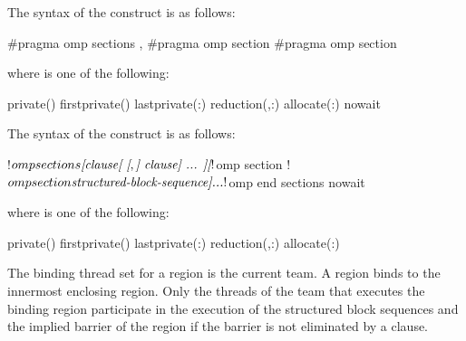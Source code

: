 \syntax
\begin{ccppspecific}
The syntax of the  construct is as follows:

\begin{ompcPragma}
#pragma omp sections \plc{[clause[ [},\plc{] clause] ... ] new-line}
   {
   \plc{[}#pragma omp section \plc{]}
   \plc{[}#pragma omp section 
      \plc{structured-block-sequence]}
   }
\end{ompcPragma}

where  is one of the following:

{}
\begin{indentedcodelist}
private()
firstprivate()
lastprivate(\plc{[ lastprivate-modifier}:\plc{] list})
reduction(\plc{[reduction-modifier },\plc{] reduction-identifier }:)
allocate(\plc{[allocator }:\plc{] list})
nowait
\end{indentedcodelist}
\end{ccppspecific}

\begin{fortranspecific}
The syntax of the  construct is as follows:

\begin{ompfPragma}
!$omp sections \plc{[clause[ [},\plc{] clause] ... ]}
   \plc{[}!$omp section\plc{]}
   \plc{[}!$omp section
      \plc{structured-block-sequence]}
   \plc{...}
!$omp end sections \plc{[}nowait\plc{]}
\end{ompfPragma}

\begin{samepage}
where  is one of the following:

{}
\begin{indentedcodelist}
private()
firstprivate()
lastprivate(\plc{[ lastprivate-modifier}:\plc{] list})
reduction(\plc{[reduction-modifier },\plc{] reduction-identifier }:)
allocate(\plc{[allocator }:\plc{] list})
\end{indentedcodelist}
\end{samepage}
\end{fortranspecific}

\binding
The binding thread set for a  region is the current team. A 
 region binds to the innermost enclosing  region. 
Only the threads of the team that executes the binding  region 
participate in the execution of the structured block sequences and the implied barrier 
of the  region if the barrier is not eliminated by a 
 clause.

